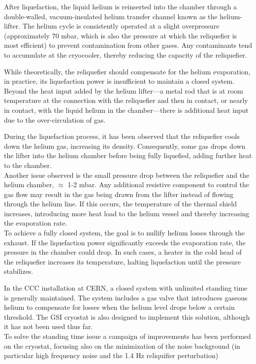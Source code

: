 \documentclass[12pt,a4paper]{report}
\begin{document}
        After liquefaction, the liquid helium is reinserted into the chamber through a double-walled, vacuum-insulated helium transfer channel known as the helium-lifter. The helium cycle is consistently operated at a slight overpressure (approximately 70 mbar, which is also the pressure at which the reliquefier is most efficient) to prevent contamination from other gases. Any contaminants tend to accumulate at the cryocooler, thereby reducing the capacity of the reliquefier.
        
        While theoretically, the reliquefier should compensate for the helium evaporation, in practice, its liquefaction power is insufficient to maintain a closed system. Beyond the heat input added by the helium lifter—a metal rod that is at room temperature at the connection with the reliquefier and then in contact, or nearly in contact, with the liquid helium in the chamber—there is additional heat input due to the over-circulation of gas. 
        
        During the liquefaction process, it has been observed that the reliquefier cools down the helium gas, increasing its density. Consequently, some gas drops down the lifter into the helium chamber before being fully liquefied, adding further heat to the chamber. \\ Another issue observed is the small pressure drop between the reliquefier and the helium chamber, $\approx$ 1-2 mbar. Any additional resistive component to control the gas flow may result in the gas being drawn from the lifter instead of flowing through the helium line. If this occurs, the temperature of the thermal shield increases, introducing more heat load to the helium vessel and thereby increasing the evaporation rate.\\
        To achieve a fully closed system, the goal is to nullify helium losses through the exhaust. If the liquefaction power significantly exceeds the evaporation rate, the pressure in the chamber could drop. In such cases, a heater in the cold head of the reliquefier increases its temperature, halting liquefaction until the pressure stabilizes.
        
        In the CCC installation at CERN, a closed system with unlimited standing time is generally maintained. The system includes a gas valve that introduces gaseous helium to compensate for losses when the helium level drops below a certain threshold. The GSI cryostat is also designed to implement this solution, although it has not been used thus far.\\
        To solve the standing time issue a campaign of improvements has been performed on the cryostat, focusing also on the minimization of the noise background (in particular high frequency noise and the 1.4 Hz reliquifier perturbation)
\end{document}
